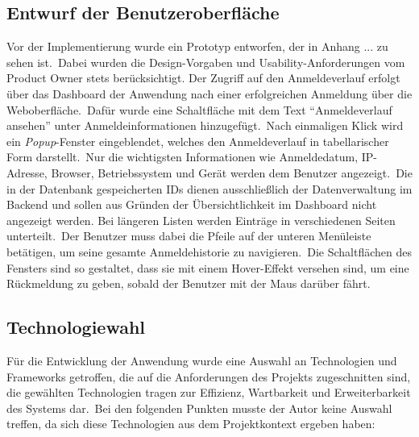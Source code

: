 %

\subsection{Entwurf der Benutzeroberfläche}
\label{subsec:Benutzeroberflaeche}

Vor der Implementierung wurde ein Prototyp entworfen, der in Anhang ... zu sehen ist.\ Dabei wurden die Design-Vorgaben und Usability-Anforderungen vom Product Owner stets berücksichtigt.
Der Zugriff auf den Anmeldeverlauf erfolgt über das Dashboard der Anwendung nach einer erfolgreichen Anmeldung über die Weboberfläche.\ Dafür wurde eine Schaltfläche mit dem Text "`Anmeldeverlauf ansehen"' unter
Anmeldeinformationen hinzugefügt.\ Nach einmaligen Klick wird ein \textit{Popup}-Fenster eingeblendet, welches den Anmeldeverlauf in tabellarischer Form darstellt.\ Nur die wichtigsten Informationen wie Anmeldedatum, IP-Adresse,
Browser, Betriebssystem und Gerät werden dem Benutzer angezeigt.\ Die in der Datenbank gespeicherten IDs dienen ausschließlich der Datenverwaltung im Backend und sollen aus Gründen der Übersichtlichkeit im Dashboard nicht angezeigt werden.
Bei längeren Listen werden Einträge in verschiedenen Seiten unterteilt.\ Der Benutzer muss dabei die Pfeile auf der unteren Menüleiste betätigen, um seine gesamte Anmeldehistorie zu navigieren.\ Die Schaltflächen des Fensters sind
so gestaltet, dass sie mit einem Hover-Effekt versehen sind, um eine Rückmeldung zu geben, sobald der Benutzer mit der Maus darüber fährt.\

\subsection{Technologiewahl}
\label{subsec:Technologiewahl}

Für die Entwicklung der Anwendung wurde eine Auswahl an Technologien und Frameworks getroffen, die auf die Anforderungen des Projekts zugeschnitten sind, die gewählten Technologien
tragen zur Effizienz, Wartbarkeit und Erweiterbarkeit des Systems dar.\ Bei den folgenden Punkten musste der Autor keine Auswahl treffen, da sich diese Technologien aus dem Projektkontext ergeben
haben:

